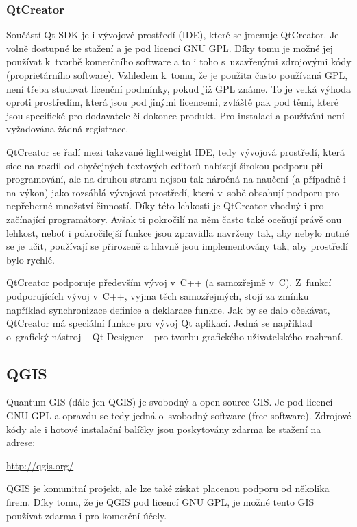 \documentclass[a4paper,12pt]{article}
\begin{document}
\subsubsection{QtCreator}
Součástí Qt SDK je i vývojové prostředí (IDE), které se jmenuje QtCreator.
Je volně dostupné ke stažení a je pod licencí GNU GPL.
Díky tomu je možné jej používat k~tvorbě komerčního software a to i toho s~uzavřenými zdrojovými kódy (proprietárního software).
Vzhledem k~tomu, že je použita často používaná GPL, není třeba studovat licenční podmínky, pokud již GPL známe.
To je velká výhoda oproti prostředím, která jsou pod jinými licencemi, zvláště pak pod těmi, které jsou specifické pro dodavatele či dokonce produkt.
Pro instalaci a používání není vyžadována žádná registrace.

QtCreator se řadí mezi takzvané lightweight IDE, tedy vývojová prostředí, která sice na rozdíl od obyčejných textových editorů nabízejí širokou podporu při programování,
ale na druhou stranu nejsou tak náročná na naučení (a případně i na výkon) jako rozsáhlá vývojová prostředí, která v~sobě obsahují podporu pro nepřeberné množství činností.
Díky této lehkosti je QtCreator vhodný i pro začínající programátory.
Avšak ti pokročilí na něm často také oceňují právě onu lehkost, neboť i pokročilejší funkce jsou zpravidla navrženy tak,
aby nebylo nutné se je učit, používají se přirozeně a hlavně jsou implementovány tak, aby prostředí bylo rychlé.

QtCreator podporuje především vývoj v~C++ (a samozřejmě v~C).
Z~funkcí podporujících vývoj v~C++, vyjma těch samozřejmých, stojí za zmínku například synchronizace definice a deklarace funkce.
Jak by se dalo očekávat, QtCreator má speciální funkce pro vývoj Qt aplikací.
Jedná se například o~grafický nástroj -- Qt Designer -- pro tvorbu grafického uživatelského rozhraní.

\subsection{QGIS}
Quantum GIS (dále jen QGIS) je svobodný a open-source GIS.
Je pod licencí GNU GPL a opravdu se tedy jedná o~svobodný software (free software).
Zdrojové kódy ale i hotové instalační balíčky jsou poskytovány zdarma ke stažení na adrese:
\begin{center}\url{http://qgis.org/}\end{center}
QGIS je komunitní projekt, ale lze také získat placenou podporu od několika firem.
Díky tomu, že je QGIS pod licencí GNU GPL, je možné tento GIS používat zdarma i pro komerční účely.
\end{document}
